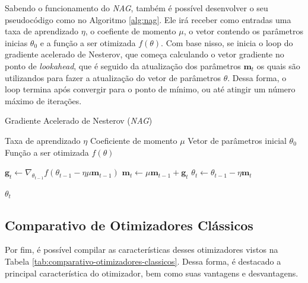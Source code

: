 Sabendo o funcionamento do \textit{NAG}, também é possível desenvolver o seu pseudocódigo como no Algoritmo \ref{alg:nag}. Ele irá receber como entradas uma taxa de aprendizado $\eta$, o coefiente de momento $\mu$, o vetor contendo os parâmetros inicias $\theta_0$ e a função a ser otimizada $f(\theta)$. Com base nisso, se inicia o loop do gradiente acelerado de Nesterov, que começa calculando o vetor gradiente no ponto de \textit{lookahead}, que é seguido da atualização dos parâmetros $\textbf{m}_t$ os quais são utilizandos para fazer a atualização do vetor de parâmetros $\theta$. Dessa forma, o loop termina após convergir para o ponto de mínimo, ou até atingir um número máximo de iterações.

\begin{algorithm}[H] %
    \caption{Gradiente Acelerado de Nesterov (\textit{NAG})}
    \label{alg:nag}
    \begin{algorithmic}[1] %

    \Require Taxa de aprendizado $\eta$
    \Require Coeficiente de momento $\mu$
    \Require Vetor de parâmetros inicial $\theta_0$
    \Require Função a ser otimizada $f(\theta)$

        \State $\textbf{g}_t \leftarrow \nabla_{\theta_{t-1}} f(\theta_{t-1} - \eta \mu \textbf{m}_{t-1})$
        \State $\textbf{m}_t \gets \mu \textbf{m}_{t-1} + \textbf{g}_t$
        \State $\theta_t \gets \theta_{t-1} - \eta \textbf{m}_t$
    \EndWhile

    \State \Return $\theta_t$ 
    \end{algorithmic}
\end{algorithm}

\subsection{Comparativo de Otimizadores Clássicos}

Por fim, é possível compilar as características desses otimizadores vistos na Tabela \ref{tab:comparativo-otimizadores-classicos}. Dessa forma, é destacado a principal característica do otimizador, bem como suas vantagens e desvantagens.

